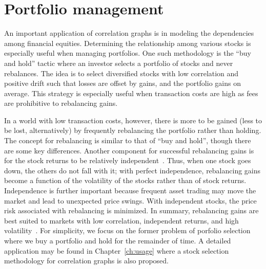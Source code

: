 \section{Portfolio management}
\label{sec:intro:finance}

An important application of correlation graphs is in modeling the dependencies 
among financial equities. Determining the relationship among various stocks is 
especially useful when managing portfolios. One such methodology is the ``buy 
and hold'' tactic where an investor selects a portfolio of stocks and never 
rebalances. The idea is to select diversified stocks with low correlation and 
positive drift such that losses are offset by gains, and the portfolio gains on 
average. This strategy is especially useful when transaction costs are high as 
fees are prohibitive to rebalancing gains. 

In a world with low transaction costs, however, there is more to be gained 
(less to be lost, alternatively) by frequently rebalancing the portfolio rather 
than holding. The concept for rebalancing is similar to that of ``buy and 
hold'', though there are some key differences. Another component for successful 
rebalancing gains is for the stock returns to be relatively 
independent~\cite{liuh2016}. Thus, when one stock goes down, the others do not 
fall with it; with perfect independence, rebalancing gains become a function of 
the volatility of the stocks rather than of stock returns. Independence is 
further important because frequent asset trading may move the market and lead 
to unexpected price swings. With independent stocks, the price risk associated 
with rebalancing is minimized. In summary, rebalancing gains are best suited to 
markets with low correlation, independent returns, and high 
volatility~\cite{liuh2016}. For simplicity, we focus on the former problem of 
porfolio selection where we buy a portfolio and hold for the remainder of time. 
A detailed application may be found in Chapter~\ref{ch:usage} where
a stock selection methodology for correlation graphs is also proposed.

